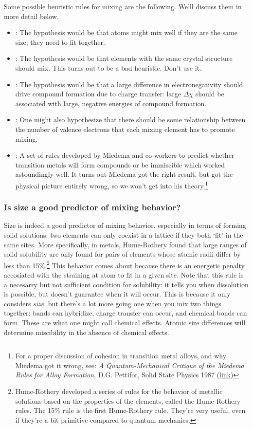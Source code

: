 \documentclass[12pt]{article}
\begin{document}
Some possible heuristic rules for mixing are the following. We'll discuss them in more detail below.
\begin{itemize}
\item {}: The hypothesis would be that atoms might mix well if they are the same size; they need to fit together.
\item {}: The hypothesis would be that elements with the same crystal structure should mix. This turns out to be a bad heuristic. Don't use it.
\item {}: The hypothesis would be that a large difference in electronegativity should drive compound formation due to charge transfer: large $\Delta \chi$ should be associated with large, negative energies of compound formation.
\item {}: One might also hypothesize that there should be some relationship between the number of valence electrons that each mixing element has to promote mixing.
\item {}: A set of rules developed by Miedema and co-workers to predict whether transition metals will form compounds or be immiscible which worked astoundingly well. It turns out Miedema got the right result, but got the physical picture entirely wrong, so we won't get into his theory.\footnote{For a proper discussion of cohesion in transition metal alloys, and why Miedema got it wrong, see: \textit{A Quantum-Mechanical Critique of the Miedema Rules for Alloy Formation}, D.G. Pettifor, Solid State Physics  1987 (\href{http://libraries.mit.edu/get/ssp}{link})} 
\end{itemize}

\subsubsection{Is size a good predictor of mixing behavior?}
Size is indeed a good predictor of mixing behavior, especially in terms of forming solid solutions: two elements can only coexist in a lattice if they both `fit' in the same sites. More specifically, in metals, Hume-Rothery found that large ranges of solid solubility are only found for pairs of elements whose  atomic radii differ by less than 15\%.\footnote{Hume-Rothery developed a series of rules for the behavior of metallic solutions based on the properties of the elements, called the Hume-Rothery rules. The 15\% rule is the first Hume-Rothery rule. They're very useful, even if they're a bit primitive compared to quantum mechanics.} This behavior comes about because there is an energetic penalty accosiated with the straining at atom to fit in a given site. Note that this rule is a necesarry but not sufficient condition for solubility: it tells you when dissolution is possible, but doesn't guarantee when it will occur. This is because it only considers \emph{size}, but there's a lot more going one when you mix two things together: bands can hybridize, charge transfer can occur, and chemical bonds can form. These are what one might call chemical effects. Atomic size differences will determine miscibility in the absence of chemical effects.
\end{document}
